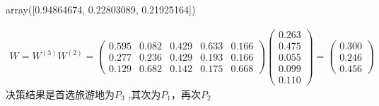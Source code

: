 \documentclass[letterpaper,10pt,english]{sphinxmanual}
\begin{document}
\begin{sphinxVerbatim}[commandchars=\\\{\}]
                      
                 
\end{sphinxVerbatim}

\begin{sphinxVerbatim}[commandchars=\\\{\}]
  \PYG{p}{[}\PYG{p}{[}\PYG{p}{]}\PYG{p}{[}\PYG{p}{]}\PYG{p}{]}            
\end{sphinxVerbatim}

\begin{sphinxVerbatim}[commandchars=\\\{\}]
array([0.94864674, 0.22803089, 0.21925164])
\end{sphinxVerbatim}

\begin{equation*}
\begin{split}
W=W^{(3)} W^{(2)}=\left(\begin{array}{ccccc}
{0.595} & {0.082} & {0.429} & {0.633} & {0.166} \\
{0.277} & {0.236} & {0.429} & {0.193} & {0.166} \\
{0.129} & {0.682} & {0.142} & {0.175} & {0.668}
\end{array}\right)\left(\begin{array}{c}
{0.263} \\
{0.475} \\
{0.055} \\
{0.099} \\
{0.110}
\end{array}\right)=\left(\begin{array}{c}
{0.300} \\
{0.246} \\
{0.456}
\end{array}\right)
\end{split}
\end{equation*}
决策结果是首选旅游地为\(P_3\) ,其次为\(P_1\)，再次\(P_2\)
\end{document}
